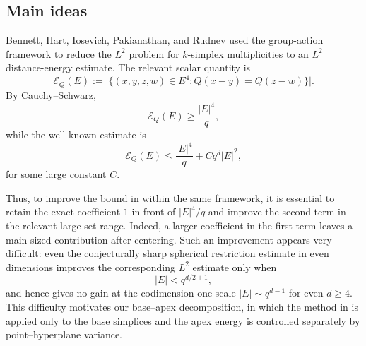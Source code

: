 \documentclass[11pt]{article}
\theoremstyle{remark}
\numberwithin{equation}{section}
\newcommand{\1}{\mathbf 1}
\begin{document}
\subsection{Main ideas}
\label{sec:intro-main-ideas}


Bennett, Hart, Iosevich, Pakianathan, and Rudnev \cite{BHIPR}
used the group-action framework to reduce the \(L^2\) problem for
\(k\)-simplex multiplicities to an \(L^2\) distance-energy estimate.
The relevant scalar quantity is
\[
 \mathcal E_Q(E)
 :=
 \bigl|\{(x,y,z,w)\in E^4:
 Q(x-y)=Q(z-w)\}\bigr|.
\]
By Cauchy--Schwarz,
\[
 \mathcal E_Q(E)\geq \frac{|E|^4}{q},
\]
while the well-known estimate is
\[
 \mathcal E_Q(E)
 \leq
 \frac{|E|^4}{q}+Cq^d|E|^2,
\]
for some large constant $C$.

Thus, to improve the bound in \cite{BHIPR} within the same framework, it is
essential to retain the exact coefficient \(1\) in front of
\(|E|^4/q\) and improve the second term in the relevant large-set
range.  Indeed, a larger coefficient in the first term leaves a
main-sized contribution after centering.  Such an improvement appears
very difficult: even the conjecturally sharp spherical restriction
estimate in even dimensions improves the corresponding \(L^2\)
estimate only when
\[
 |E|<q^{d/2+1},
\]
and hence gives no gain at the codimension-one scale
\(|E|\sim q^{d-1}\) for even \(d\geq4\).  This difficulty motivates
our base--apex decomposition, in which the method in \cite{BHIPR} is applied
only to the base simplices and the apex energy is controlled separately
by point--hyperplane variance.
\end{document}

